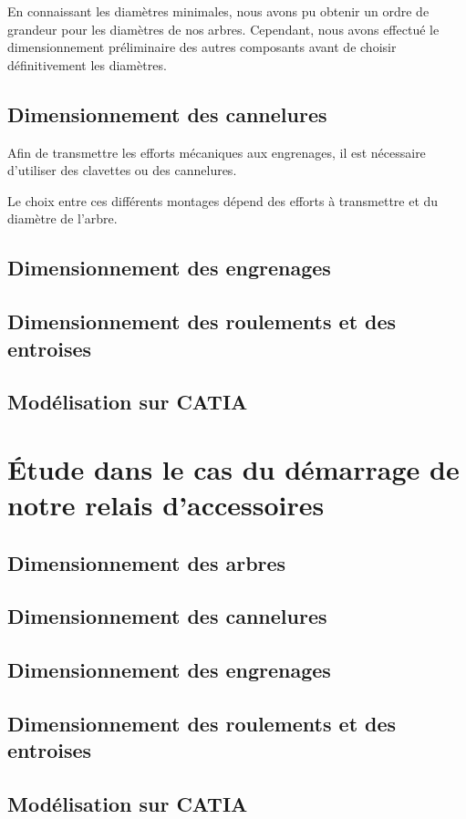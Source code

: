 \documentclass{config}
\begin{document}
\begin{spacing}{1.2}
En connaissant les diamètres minimales, nous avons pu obtenir un ordre de grandeur pour les diamètres de nos arbres. Cependant, nous avons effectué le dimensionnement préliminaire des autres composants avant de choisir définitivement les diamètres.

\newpage
\subsection{Dimensionnement des cannelures}
Afin de transmettre les efforts mécaniques aux engrenages, il est nécessaire d'utiliser des clavettes ou des cannelures. 

Le choix entre ces différents montages dépend des efforts à transmettre et du diamètre de l'arbre.


\subsection{Dimensionnement des engrenages}

\subsection{Dimensionnement des roulements et des entroises}

\subsection{Modélisation sur CATIA}


\section{Étude dans le cas du démarrage de notre relais d'accessoires}

\subsection{Dimensionnement des arbres}

\subsection{Dimensionnement des cannelures}

\subsection{Dimensionnement des engrenages}

\subsection{Dimensionnement des roulements et des entroises}

\subsection{Modélisation sur CATIA}

\end{spacing}
\end{document}

